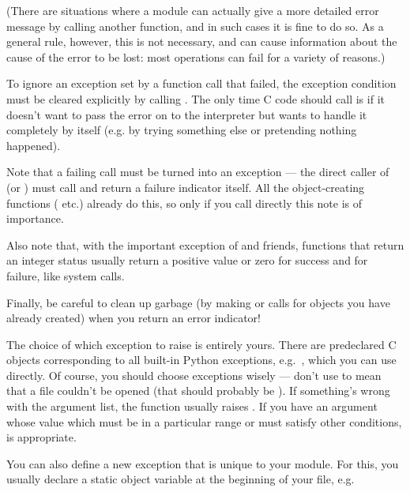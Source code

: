 \documentclass{manual}
\begin{document}
(There are situations where a module can actually give a more detailed
error message by calling another  function, and in
such cases it is fine to do so.  As a general rule, however, this is
not necessary, and can cause information about the cause of the error
to be lost: most operations can fail for a variety of reasons.)

To ignore an exception set by a function call that failed, the exception
condition must be cleared explicitly by calling . 
The only time C code should call  is if it doesn't
want to pass the error on to the interpreter but wants to handle it
completely by itself (e.g. by trying something else or pretending
nothing happened).

Note that a failing  call must be turned into an
exception --- the direct caller of  (or
) must call  and
return a failure indicator itself.  All the object-creating functions
( etc.) already do this, so only if you
call  directly this note is of importance.

Also note that, with the important exception of
 and friends, functions that return an
integer status usually return a positive value or zero for success and
 for failure, like \UNIX{} system calls.

Finally, be careful to clean up garbage (by making
 or  calls for objects
you have already created) when you return an error indicator!

The choice of which exception to raise is entirely yours.  There are
predeclared C objects corresponding to all built-in Python exceptions,
e.g.\ , which you can use directly.  Of
course, you should choose exceptions wisely --- don't use
 to mean that a file couldn't be opened (that
should probably be ).  If something's wrong with
the argument list, the  function usually
raises .  If you have an argument whose value
which must be in a particular range or must satisfy other conditions,
 is appropriate.

You can also define a new exception that is unique to your module.
For this, you usually declare a static object variable at the
beginning of your file, e.g.
\end{document}
